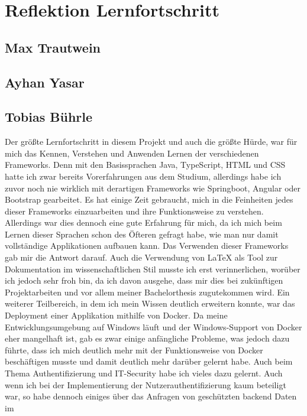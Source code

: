 \chapter{Reflektion Lernfortschritt}\label{ch:reflektion-lernfortschritt}


\section{Max Trautwein}


\section{Ayhan Yasar}


\section{Tobias Bührle}
Der größte Lernfortschritt in diesem Projekt und auch die größte Hürde, war für mich das
Kennen, Verstehen und Anwenden Lernen der verschiedenen Frameworks. Denn mit den
Basissprachen Java, TypeScript, HTML und CSS hatte ich zwar bereits Vorerfahrungen aus dem
Studium, allerdings habe ich zuvor noch nie wirklich mit derartigen Frameworks wie
Springboot, Angular oder Bootstrap gearbeitet. Es hat einige Zeit gebraucht, mich in die
Feinheiten jedes dieser Frameworks einzuarbeiten und ihre Funktionsweise zu verstehen.
Allerdings war dies dennoch eine gute Erfahrung für mich, da ich mich beim
Lernen dieser Sprachen schon des Öfteren gefragt habe, wie man nur damit vollständige
Applikationen aufbauen kann. Das Verwenden dieser Frameworks gab mir die Antwort darauf.
Auch die Verwendung von LaTeX als Tool zur Dokumentation im wissenschaftlichen Stil
musste ich erst verinnerlichen, worüber ich jedoch sehr froh bin, da ich davon ausgehe,
dass mir dies bei zukünftigen Projektarbeiten und vor allem meiner Bachelorthesis 
zugutekommen wird. Ein weiterer Teilbereich, in dem ich mein Wissen deutlich erweitern 
konnte, war das Deployment einer Applikation mithilfe von Docker. Da meine 
Entwicklungsumgebung
auf Windows läuft und der Windows-Support von Docker eher mangelhaft ist, gab es zwar
einige anfängliche Probleme, was jedoch dazu führte, dass ich mich deutlich mehr
mit der Funktionsweise von Docker beschäftigen musste und damit deutlich mehr darüber
gelernt habe. Auch beim Thema Authentifizierung und IT-Security habe ich vieles dazu
gelernt. Auch wenn ich bei der Implementierung der Nutzerauthentifizierung kaum beteiligt
war, so habe dennoch einiges über das Anfragen von geschützten backend Daten im

